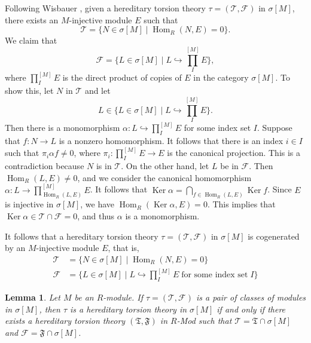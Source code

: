 \documentclass{amsart}
\newtheorem{lemma}[thm]{Lemma}
\theoremstyle{definition}
\theoremstyle{remark}
\numberwithin{equation}{section}
\DeclareMathOperator{\Ker}{Ker}
\DeclareMathOperator{\Hom}{Hom}
\newcommand{\sm}{\sigma[M]}
\begin{document}
	Following Wisbauer \cite[9.5]{wisbauermodules}, 
	given a hereditary torsion theory $\tau=(\mathcal{T},\mathcal{F})$ in $\sm$, 
	there exists an $M$-injective module $E$ such that 
	\[ \mathcal{T}=\{N\in\sm\mid \Hom_R(N,E)=0\} . \] 
	We claim that 
	\[ \textstyle \mathcal{F}=\{L\in\sm\mid L\hookrightarrow \prod_I^{[M]}E\} , \] 
	where  $\prod_I^{[M]}E$ is the direct product of copies of $E$ 
	in the category $\sm$. 
	To show this, let $N$ in $\mathcal{T}$ and let
	\[ \textstyle L\in\{L\in\sm\mid L\hookrightarrow \prod_I^{[M]}E\} . \] 
	Then there is a monomorphism $\alpha:L\hookrightarrow \prod_I^{[M]}E$ 
	for some index set $I$. 
	Suppose that $f:N\to L$ is a nonzero homomorphism. 
	It follows that there is an index $i\in I$ 
	such that $\pi_i\alpha f\neq 0$, 
	where $\pi_i:\prod_I^{[M]}E\to E$ is the canonical projection. 
	This is a contradiction because $N$ is in $\mathcal{T}$. 
	On the other hand, let $L$ be in $\mathcal{F}$. 
	Then $\Hom_R(L,E)\neq 0$, 
	and we consider the canonical homomorphism 
	$\alpha:L\to \prod_{\Hom_R(L,E)}^{[M]}E$. 
	It follows that $\Ker\alpha=\bigcap_{f\in\Hom_R(L,E)}\Ker f$. 
	Since $E$ is injective in $\sm$, 
	we have $\Hom_R(\Ker\alpha,E)=0$. 
	This implies that $\Ker\alpha\in\mathcal{T}\cap\mathcal{F}=0$,
	and thus $\alpha$ is a monomorphism. 
	
	It follows that a hereditary torsion theory 
	$\tau=(\mathcal{T},\mathcal{F})$ in $\sm$ 
	is cogenerated by an $M$-injective module $E$, that is,
	\begin{equation}\label{11}
		\begin{split}
			\mathcal{T}& =\{N\in\sm\mid \Hom_R(N,E)=0\} \\
			\mathcal{F}& =\{L\in\sm\mid L\hookrightarrow \textstyle{\prod_I^{[M]}E}\;
			\text{for some index set}\;I\}
		\end{split}
	\end{equation}
	
	\begin{lemma}
		Let $M$ be an $R$-module. 
		If $\tau=(\mathcal{T},\mathcal{F})$ 
		is a pair of classes of modules in $\sm$, 
		then $\tau$ is a hereditary torsion theory in $\sm$ 
		if and only if 
		there exists a hereditary torsion theory 
		$(\mathfrak{T},\mathfrak{F})$ in $R$-Mod 
		such that $\mathcal{T}=\mathfrak{T}\cap\sm$ and 
		$\mathcal{F}=\mathfrak{F}\cap\sm$.
	\end{lemma}
	
\end{document}
